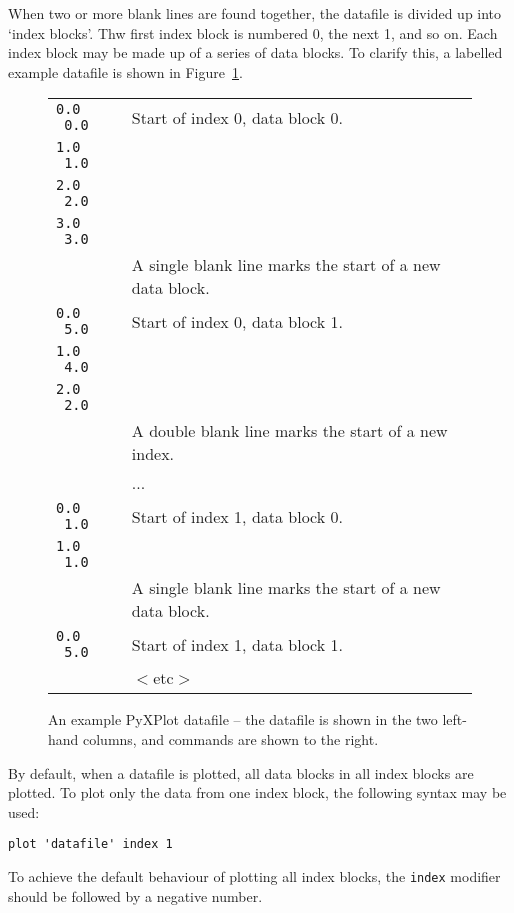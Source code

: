 When two or more blank lines are found together, the datafile is divided up
into `index blocks'. Thw first index block is numbered 0, the next 1, and so
on. Each index block may be made up of a series of data blocks. To clarify
this, a labelled example datafile is shown in Figure~\ref{sample_datafile}.

\begin{figure}
\begin{tabular}{p{2.2cm}l}
\hline
{\tt 0.0 \ 0.0} & Start of index 0, data block 0. \\
{\tt 1.0 \ 1.0} & \\
{\tt 2.0 \ 2.0} & \\
{\tt 3.0 \ 3.0} & \\
                   & A single blank line marks the start of a new data block. \\
{\tt 0.0 \ 5.0} & Start of index 0, data block 1. \\
{\tt 1.0 \ 4.0} & \\
{\tt 2.0 \ 2.0} & \\
                   & A double blank line marks the start of a new index. \\
                   & ... \\
{\tt 0.0 \ 1.0} & Start of index 1, data block 0. \\
{\tt 1.0 \ 1.0} & \\
                   & A single blank line marks the start of a new data block. \\
{\tt 0.0 \ 5.0} & Start of index 1, data block 1. \\
                   & $<$etc$>$ \\
\hline
\end{tabular}
\caption{An example PyXPlot datafile -- the datafile is shown in the two left-hand columns, and commands are shown to the right.}
\label{sample_datafile}
\end{figure}

By default, when a datafile is plotted, all data blocks in all index blocks are
plotted. To plot only the data from one index block, the following syntax may
be used:

\begin{verbatim}
plot 'datafile' index 1
\end{verbatim}

\noindent To achieve the default behaviour of plotting all index blocks, the
{\tt index} modifier should be followed by a negative number.

